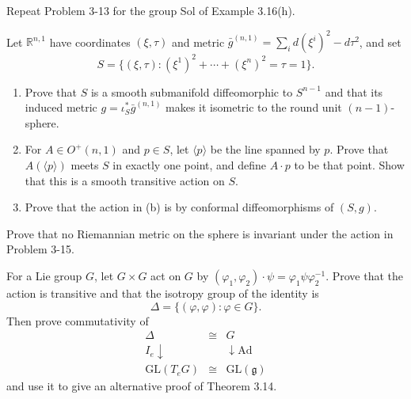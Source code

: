 \begin{exercise}
\label{prob:sol-group-metrics}
Repeat Problem 3-13 for the group Sol of Example 3.16(h).
\end{exercise}

\begin{exercise}
\label{prob:minkowski-hyperboloid}
Let $\mathbb R^{n,1}$ have coordinates $(\xi,\tau)$ and metric
$\bar g^{(n,1)}=\sum_i d(\xi^i)^2-d\tau^2$, and set
\[
S=\{(\xi,\tau):(\xi^1)^2+\cdots+(\xi^n)^2=\tau=1\}.
\]
\begin{enumerate}
\item[(a)] Prove that $S$ is a smooth submanifold diffeomorphic to
$S^{n-1}$ and that its induced metric $g=\iota_S^*\bar g^{(n,1)}$ makes it isometric
to the round unit $(n-1)$-sphere.
\item[(b)] For $A\in O^+(n,1)$ and $p\in S$, let $\langle p\rangle$ be the line
spanned by $p$. Prove that $A(\langle p\rangle)$ meets $S$ in exactly one point,
and define $A\cdot p$ to be that point. Show that this is a smooth transitive
action on $S$.
\item[(c)] Prove that the action in (b) is by conformal diffeomorphisms of
$(S,g)$.
\end{enumerate}
\end{exercise}

\begin{exercise}
\label{prob:no-riemannian-metric-invariant-lorentz}
Prove that no Riemannian metric on the sphere is invariant under the action in
Problem 3-15.
\end{exercise}

\begin{exercise}
\label{prob:lie-group-adjoint-representation}
For a Lie group $G$, let $G\times G$ act on $G$ by
$(\varphi_1,\varphi_2)\cdot\psi=\varphi_1\psi\varphi_2^{-1}$. Prove that the
action is transitive and that the isotropy group of the identity is
\[
\Delta=\{(\varphi,\varphi):\varphi\in G\}.
\]
Then prove commutativity of
\[
\begin{array}{ccc}
\Delta & \cong & G \\
I_e \downarrow & & \downarrow \mathrm{Ad} \\
\mathrm{GL}(T_eG) & \cong & \mathrm{GL}(\mathfrak g)
\end{array}
\]
and use it to give an alternative proof of Theorem 3.14.
\end{exercise}

